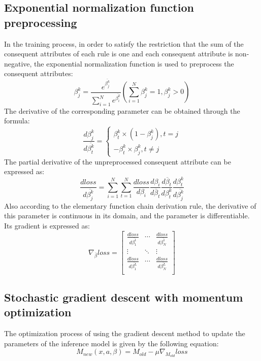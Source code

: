 \documentclass{ieeeaccess}
\begin{document}
\subsection{Exponential normalization function preprocessing}
In the training process, in order to satisfy the restriction that the sum of the consequent attributes of each rule is one and each consequent attribute is non-negative,
the exponential normalization function is used to preprocess the consequent attributes:
\begin{equation}
    \beta_j^k=\frac{e^{\overline{\beta_j^k}}}{\sum_{i=1}^Ne^{\overline{\beta_i^k}}}(\sum_{i=1}^N\beta_j^k=1,\beta_j^k>0)
\end{equation}
The derivative of the corresponding parameter can be obtained through the formula:
\begin{equation}
    \frac{d\beta_j^k}{d\overline{\beta_t^k}}=
    \left\{
    \begin{aligned}
        \beta_t^k\times(1-\beta_j^k),t=j \\
        -\beta_t^k\times\beta_j^k,t\neq j
    \end{aligned}
    \right.
\end{equation}
The partial derivative of the unpreprocessed consequent attribute can be expressed as:
\begin{equation}
    \frac{dloss}{d\overline{\beta_j^k}}=\sum_{i=1}^N\sum_{t=1}^N\frac{dloss}{d\beta_i}\frac{d\beta_i}{d\overline{\beta}_t}\frac{d\overline{\beta}_t}{d\beta_t^k}\frac{d\beta_t^k}{d\overline{\beta_j^k}}
\end{equation}
Also according to the elementary function chain derivation rule, the derivative of this parameter is continuous in its domain,
and the parameter is differentiable. Its gradient is expressed as:
\begin{equation}
    \nabla_{\overline{\beta}}loss=\left[\begin{matrix}
            \frac{dloss}{d\overline{\beta_1^1}} & \cdots & \frac{dloss}{d\overline{\beta_N^1}} \\
            \vdots                              & \ddots & \vdots                              \\
            \frac{dloss}{d\overline{\beta_1^L}} & \cdots & \frac{dloss}{d\overline{\beta_N^L}} \\
        \end{matrix}\right]
\end{equation}


\subsection{Stochastic gradient descent with momentum optimization}
The optimization process of using the gradient descent method to update the parameters of the inference model is given by the following equation:
\begin{equation}
    M_{new}(x,a,\beta)=M_{old}-\mu\nabla_{M_{old}}loss
\end{equation}
\end{document}
